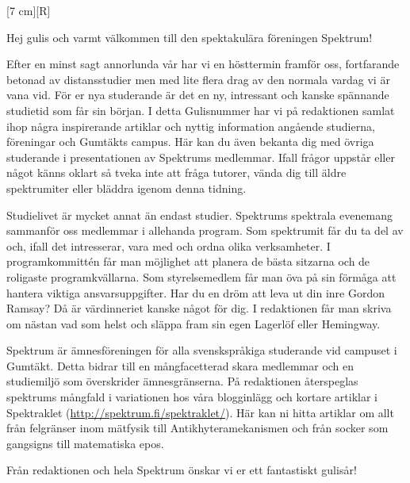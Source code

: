 \documentclass{spektraklet}
\begin{document}
\begin{ledaren}{}

[7 cm][R]


Hej gulis och varmt välkommen till den spektakulära föreningen Spektrum!


Efter en minst sagt annorlunda vår har vi en hösttermin framför oss, fortfarande betonad av distansstudier men med lite flera drag av den normala vardag vi är vana vid. För er nya studerande är det en ny, intressant och kanske spännande studietid som får sin början. I detta Gulisnummer har vi på redaktionen samlat ihop några inspirerande artiklar och nyttig information angående studierna, föreningar och Gumtäkts campus. Här kan du även bekanta dig med övriga studerande i presentationen av Spektrums medlemmar. Ifall frågor uppstår eller något känns oklart så tveka inte att fråga tutorer, vända dig till äldre spektrumiter eller bläddra igenom denna tidning. 

Studielivet är mycket annat än endast studier. Spektrums spektrala evenemang sammanför oss medlemmar i allehanda program. Som spektrumit får du ta del av och, ifall det intresserar, vara med och ordna olika verksamheter. I programkommittén får man möjlighet att planera de bästa sitzarna och de roligaste programkvällarna. Som styrelsemedlem får man öva på sin förmåga att hantera viktiga ansvarsuppgifter. Har du en dröm att leva ut din inre Gordon Ramsay? Då är värdinneriet kanske något för dig. I redaktionen får man skriva om nästan vad som helst och släppa fram sin egen Lagerlöf eller Hemingway.

Spektrum är ämnesföreningen för alla svenskspråkiga studerande vid campuset i Gumtäkt. Detta bidrar till en mångfacetterad skara medlemmar och en studiemiljö som överskrider ämnesgränserna. På redaktionen återspeglas spektrums mångfald i variationen hos våra blogginlägg och kortare artiklar i Spektraklet (\url{http://spektrum.fi/spektraklet/}). Här kan ni hitta artiklar om allt från felgränser inom mätfysik till Antikhyteramekanismen och från socker som gangsigns till matematiska epos.

Från redaktionen och hela Spektrum önskar vi er ett fantastiskt gulisår!
\end{ledaren}
\end{document}
